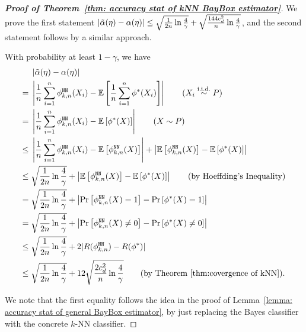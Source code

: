 \begin{proof}[\textbf{Proof of Theorem~\ref{thm: accuracy stat of kNN BayBox estimator}}]
    \label{proof: for thm: accuracy stat of kNN BayBox estimator}
    We prove the first statement $\left| {\tilde{\alpha}(\eta) - \alpha(\eta)} \right| \leq \sqrt{\frac{1}{2n}\ln{\frac{4}{\gamma}}} + \sqrt{\frac{144c_d^2}{n}\ln{\frac{4}{\gamma}}}$, and the second statement follows by a similar approach. 
    
    With probability at least $1 - \gamma$, we have 
    \begin{align*}
           & \abs{\tilde{\alpha}(\eta) - \alpha(\eta)}\\
        ={}& \abs{\frac{1}{n}\rSum{i}{1}{n}\kNNclassifier{n}(\rX_i) - \Ex{\frac{1}{n}\rSum{i}{1}{n}\phi^*(\rX_i)}} \tag{$\rX_i \overset{\text{i.i.d.}}{\sim} P$}\\
        ={}& \abs{\frac{1}{n}\rSum{i}{1}{n}\kNNclassifier{n}(\rX_i) - \Ex{\phi^*(\rX)}} \tag{$\rX \sim P$}\\
        \leq{}& \abs{\frac{1}{n}\rSum{i}{1}{n}\kNNclassifier{n}(\rX_i) - \Ex{\kNNclassifier{n}(\rX)}} + \abs{\Ex{\kNNclassifier{n}(\rX)} - \Ex{\phi^*(\rX)}} \\
        \leq{}& \sqrt{\frac{1}{2n}\ln{\frac{4}{\gamma}}} + \abs{\Ex{\kNNclassifier{n}(\rX)} - \Ex{\phi^*(\rX)}} \tag{by Hoeffding's Inequality}\\
        ={}& \sqrt{\frac{1}{2n}\ln{\frac{4}{\gamma}}} + \abs{ \pr{\kNNclassifier{n}(\rX) = 1} - \pr{\phi^*(\rX) = 1} }\\
        ={}& \sqrt{\frac{1}{2n}\ln{\frac{4}{\gamma}}} + \abs{ \pr{\kNNclassifier{n}(\rX) \neq 0} - \pr{\phi^*(\rX) \neq 0} }\\
        \leq{}& \sqrt{\frac{1}{2n}\ln{\frac{4}{\gamma}}} + 2|R(\kNNclassifier{n}) - R(\phi^{*})|\\
        \leq{}& \sqrt{\frac{1}{2n}\ln{\frac{4}{\gamma}}} + 12\sqrt{\frac{2c_d^2}{n}\ln{\frac{4}{\gamma}}}\tag{by Theorem~\ref{thm:covergence of kNN}}.
    \end{align*}

    We note that the first equality follows the idea in the proof of Lemma~\ref{lemma: accuracy stat of general BayBox estimator}, by just replacing the Bayes classifier with the concrete $k$-NN classifier.
\end{proof}

